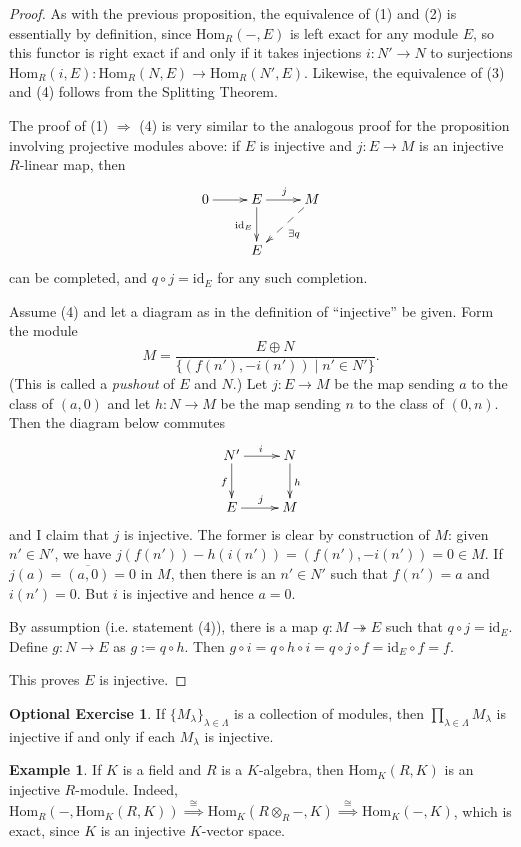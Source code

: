 \documentclass{amsart}[12pt]
\newcommand{\Hom}{\mathrm{Hom}}
\newcommand{\onto}{\twoheadrightarrow}
\newcommand{\id}{\mathrm{id}}
\newcommand{\DEF}[1]{\emph{#1}\index{#1}}
\numberwithin{equation}{section}
\theoremstyle{plain} %
\theoremstyle{definition}
\newtheorem{ex}[equation]{Example}
\newtheorem{exer}[equation]{Optional Exercise}
\theoremstyle{remark}
\begin{document}
\begin{proof} As with the previous proposition, the equivalence of (1) and (2) is essentially by definition, since $\Hom_R(-, E)$ is left exact for any module $E$, so this functor is right exact if and only if it takes injections $i:N'\to N$ to surjections $\Hom_R(i,E):\Hom_R(N,E)\to \Hom_R(N',E)$. 
Likewise, the equivalence of (3) and (4) follows from the Splitting Theorem. 

The proof of  (1) $\Rightarrow$ (4) is  very similar to the analogous proof for the proposition involving projective modules above: if $E$ is injective
and $j: E \to M$ is an injective $R$-linear map, then
$$
\xymatrix{
0 \ar[r] & E \ar[d]_{\id_E} \ar[r]^j & M \ar@{-->}[dl]^{\exists q} \\ 
& E \\
}
$$
can be completed, and $q \circ j = \id_E$ for any such completion. 


Assume (4) and let a diagram as in the definition of ``injective'' be given. Form the module 
$$M = \frac{E \oplus N}{\{(f(n'), -i(n')) \mid n' \in N' \}}.$$
(This is called a \DEF{pushout} of $E$ and $N$.)
Let $j: E \to M$ be the map sending $a$ to the class of $(a,0)$ and 
let $h: N \to M$ be the map sending $n$ to the class of $(0,n)$. Then the diagram below commutes
  $$
  \xymatrix{
    N' \ar[r]^i \ar[d]_f & N\ar[d]^h \\
    E \ar[r]^j & M}
  $$
and I claim that $j$ is injective. The former is clear by construction of $M$: given $n' \in N'$, we
  have $j(f(n'))- h(i(n'))   = (f(n'), -i(n')) = 0 \in M$.  
If $j(a) = \overline{(a,0)} = 0$ in $M$, then there is an $n' \in N'$ such
that $f(n') = a$ and $i(n') = 0$. But $i$ is injective and hence $a = 0$. 

By assumption (i.e. statement (4)), there is a map $q: M \onto  E$ such that $q \circ j = \id_E$. Define $g: N \to E$ as $g := q \circ h$.
Then $g \circ i = q \circ h \circ i = q \circ j \circ f  = \id_E \circ f = f$. 

This proves $E$ is injective. 
\end{proof}


\begin{exer} If $\{M_\lambda\}_{\lambda\in \Lambda}$ is a collection of modules, then $\prod_{\lambda\in\Lambda} M_\lambda$ is injective if and only if each $M_\lambda$ is injective.
\end{exer}


\begin{ex} If $K$ is a field and $R$ is a $K$-algebra, then $\Hom_K(R,K)$ is an injective $R$-module. Indeed, $\Hom_R(-,\Hom_K(R,K))\stackrel{\cong}{\implies} \Hom_K(R\otimes_R - ,K) \stackrel{\cong}{\implies} \Hom_K( - ,K)$, which is exact, since $K$ is an injective $K$-vector space.
\end{ex}
\end{document}
